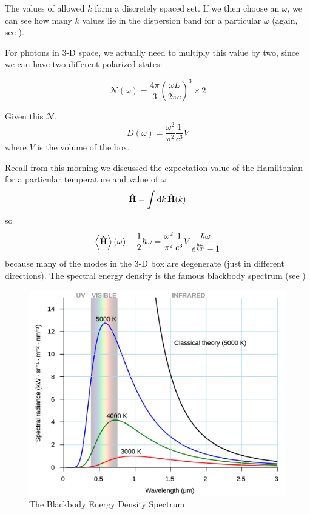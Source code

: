 \documentclass[a4paper,twoside,master.tex]{subfiles}
\begin{document}
The values of allowed $ k $ form a discretely spaced set. If we then choose an $\omega$, we can see how many $ k $ values lie in the dispersion band for a particular $\omega$ (again, see ).

For photons in 3-D space, we actually need to multiply this value by two, since we can have two different polarized states:

\begin{equation}
    \mathscr{N}(\omega) = \frac{4 \pi}{3} \left( \frac{\omega L}{2 \pi c} \right)^3 \times 2
\end{equation}

Given this $ \mathscr{N} $,
\begin{equation}
    D(\omega) = \frac{\omega^2}{\pi^2} \frac{1}{c^3} V
\end{equation}
where $ V $ is the volume of the box.

Recall from this morning we discussed the expectation value of the Hamiltonian for a particular temperature and value of $\omega$:
\begin{equation}
    \vu{H} = \int \dd{k} \vu{H}(k)
\end{equation}
so
\begin{equation}
    \ev{ \vu{H}}(\omega) - \frac{1}{2} \hbar \omega = \frac{\omega^2}{\pi^2} \frac{1}{c^3} V \frac{\hbar \omega}{e^{\frac{\hbar \omega}{kT}} - 1} 
\end{equation}
because many of the modes in the 3-D box are degenerate (just in different directions). The spectral energy density is the famous blackbody spectrum (see )

\begin{figure}[h]
    \centering
    \includegraphics[width=\textwidth/2]{figures/lec_39_blackbody_spectrum.png}
    \caption{The Blackbody Energy Density Spectrum}
    \label{fig:blackbody_spectrum}
\end{figure}
\end{document}
